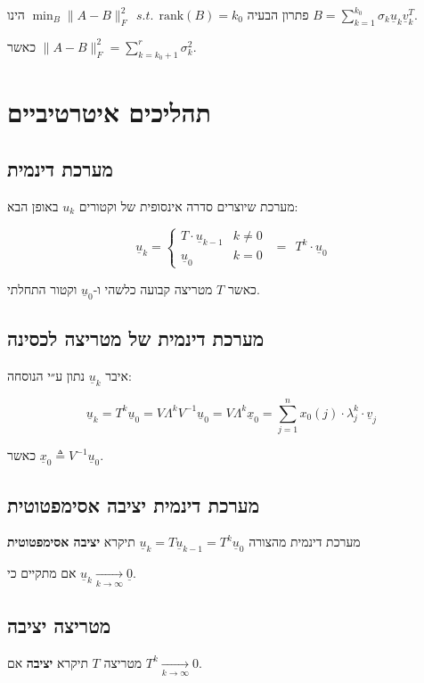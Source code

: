 \documentclass[11pt]{article}
\begin{document}
פתרון הבעיה  \(\min_B \|A - B\|_F^2\ \  s.t.\ \  \text{rank} \left( B \right) = k_0\) הינו \(B=\sum_{k=1}^{k_0}\sigma_k \underline{u}_k \underline{v}_k^T\).

כאשר \(\|A - B\|_F^2 = \sum_{k = k_0+1}^{r}\sigma_k^2\).


\section{תהליכים איטרטיביים}
\label{sec:org448b212}
\subsection{מערכת דינמית}
\label{sec:org614f88f}
מערכת שיוצרים סדרה אינסופית של וקטורים \(u_k\) באופן הבא:

\[
\underline{u}_k = \begin{cases}
T \cdot \underline{u}_{k-1} & k \ne 0 \\
\underline{u}_0 & k = 0
\end{cases}
\ \ =\ \
T^k \cdot\underline{u}_{0}
\]

כאשר \(T\) מטריצה קבועה כלשהי ו-\(\underline{u}_0\) וקטור התחלתי.

\subsection{מערכת דינמית של מטריצה לכסינה}
\label{sec:org16ac5fc}
איבר \(\underline{u}_k\) נתון ע״י הנוסחה:

\[
\underline{u}_k = T^k\underline{u}_0
=
V \Lambda^kV^{-1}\underline{u}_0
=
V \Lambda^k\underline{x}_0
=
\sum_{j=1}^{n}x_0 \left( j \right) \cdot \lambda_j^k \cdot \underline{v}_j
\]

כאשר \(\underline{x}_0 \triangleq V^{-1}\underline{u}_0\).
\subsection{מערכת דינמית יציבה אסימפטוטית}
\label{sec:orgd79d0cc}
מערכת דינמית מהצורה \(\underline{u}_k = T \underline{u}_{k-1} = T^k \underline{u}_0\) תיקרא \textbf{יציבה אסימפטוטית}

אם מתקיים כי  \(\underline{u}_k \underset{k \to \infty}{\longrightarrow}\underline{0}\).

\subsection{מטריצה יציבה}
\label{sec:orge574abe}
מטריצה \(T\) תיקרא \textbf{יציבה} אם \(T^k \underset{k \to \infty}{\longrightarrow} 0\).
\end{document}
